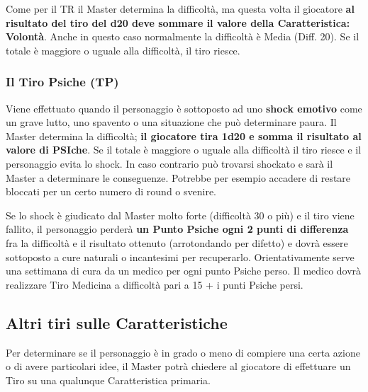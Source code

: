 Come per il TR il Master determina la difficolt\`a, ma questa volta
il giocatore \textbf{al risultato del tiro del d20 deve sommare il valore
della Caratteristica: Volont\`a}.  Anche in questo caso normalmente
la difficolt\`a \`e Media (Diff. 20).  Se il totale \`e maggiore
o uguale alla difficolt\`a, il tiro riesce.


\subsubsection{Il Tiro Psiche (TP)}

Viene effettuato quando il personaggio \`e sottoposto ad uno
\textbf{shock emotivo} come un grave lutto, uno spavento o una
situazione che pu\`o determinare paura. Il Master determina la
difficolt\`a; \textbf{il giocatore tira 1d20 e somma il risultato al
  valore di PSIche}. Se il totale \`e maggiore o uguale alla
difficolt\`a il tiro riesce e il personaggio evita lo shock.  In caso
contrario pu\`o trovarsi shockato e sar\`a il Master a determinare le
conseguenze. Potrebbe per esempio accadere di restare bloccati per un
certo numero di round o svenire.

Se lo shock \`e giudicato dal Master molto forte (difficolt\`a 30 o
pi\`u) e il tiro viene fallito, il personaggio perder\`a \textbf{un
  Punto Psiche ogni 2 punti di differenza} fra la difficolt\`a e il
risultato ottenuto (arrotondando per difetto) e dovr\`a essere
sottoposto a cure naturali o incantesimi per recuperarlo.
Orientativamente serve una settimana di cura da un medico per ogni
punto Psiche perso. Il medico dovr\`a realizzare Tiro Medicina a
difficolt\`a pari a 15 + i punti Psiche persi.


\subsection{Altri tiri sulle Caratteristiche}

Per determinare se il personaggio \`e in grado o meno di compiere
una certa azione o di avere particolari idee, il Master potr\`a
chiedere al giocatore di effettuare un Tiro su una qualunque
Caratteristica primaria.

